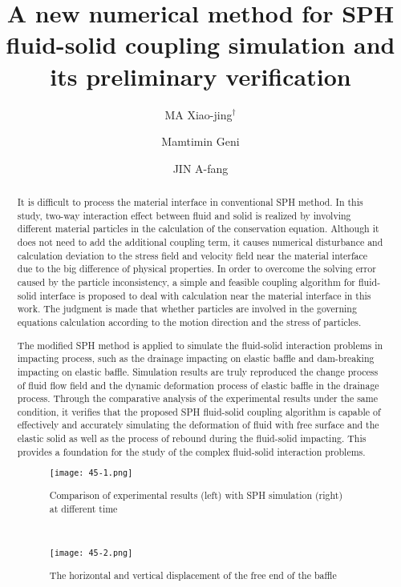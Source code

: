 \documentclass[10pt]{article}
\title{A new numerical method for SPH fluid-solid coupling simulation and its preliminary verification}
\date{}
\author[$\relax$]{MA Xiao-jing$^\dagger$}
\author[$\relax$]{Mamtimin Geni}
\author[$\relax$]{JIN A-fang}
\affil[$\relax$]{College of Electrical Engineering, Xinjiang University, Urumqi, China}
\affil[$\relax$]{\email{\dagger}{maxiaojing1983@163.com}}
\begin{document}
\maketitle


\begin{abstract}
It is difficult to process the material interface in conventional SPH method. In this study, two-way interaction effect between fluid and solid is realized by involving different material particles in the calculation of the conservation equation. Although it does not need to add the additional coupling term, it causes numerical disturbance and calculation deviation to the stress field and velocity field near the material interface due to the big difference of physical properties. In order to overcome the solving error caused by the particle inconsistency, a simple and feasible coupling algorithm for fluid-solid interface is proposed to deal with calculation near the material interface in this work. The judgment is made that whether particles are involved in the governing equations calculation according to the motion direction and the stress of particles.

The modified SPH method is applied to simulate the fluid-solid interaction problems in impacting process, such as the drainage impacting on elastic baffle and dam-breaking impacting on elastic baffle. Simulation results are truly reproduced the change process of fluid flow field and the dynamic deformation process of elastic baffle in the drainage process. Through the comparative analysis of the experimental results under the same condition, it verifies that the proposed SPH fluid-solid coupling algorithm is capable of effectively and accurately simulating the deformation of fluid with free surface and the elastic solid as well as the process of rebound during the fluid-solid impacting. This provides a foundation for the study of the complex fluid-solid interaction problems. 


\begin{figure}[!htb]
\begin{minipage}[t]{0.46\linewidth}
\centering
\texttt{[image: 45-1.png]}
\caption{Comparison of experimental results (left) with SPH simulation (right) at different time}\label{fig:45-1}
\end{minipage}
\begin{minipage}[t]{0.05\linewidth}
~
\end{minipage}
\begin{minipage}[t]{0.46\linewidth}
\centering
\texttt{[image: 45-2.png]}
\caption{The horizontal and vertical displacement of the free end of the baffle}\label{fig:45-2}
\end{minipage}
\end{figure}


\end{abstract}



\addbib
\end{document}

